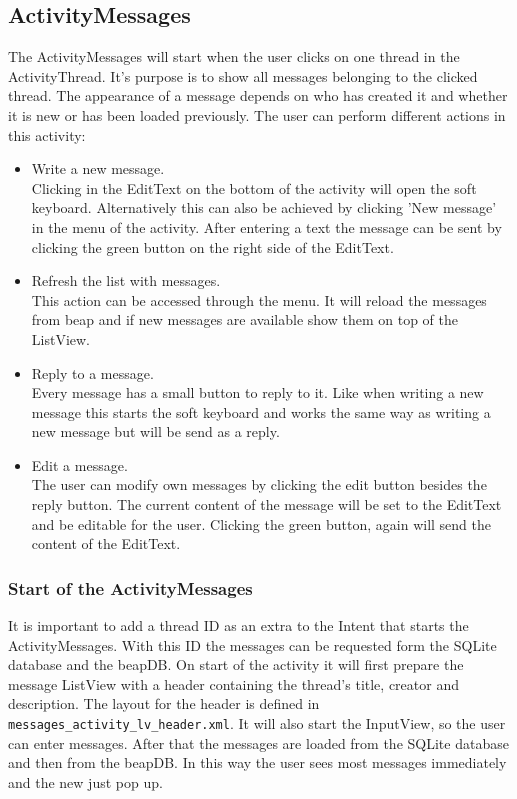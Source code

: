 \documentclass[12pt,a4paper,oneside]{report}
\newcommand{\code}[1]{\lstinline{#1}}
\begin{document}
\subsection{ActivityMessages}
The ActivityMessages will start when the user clicks on one thread in the ActivityThread. It's purpose is to show all messages belonging to the clicked thread. The appearance of a message depends on who has created it and whether it is new or has been loaded previously. The user can perform different actions in this activity:
\begin{itemize}
\item Write a new message.\\
Clicking in the EditText on the bottom of the activity will open the soft keyboard. Alternatively this can also be achieved by clicking 'New message' in the menu of the activity. After entering a text the message can be sent by clicking the green button on the right side of the EditText.

\item Refresh the list with messages.\\
This action can be accessed through the menu. It will reload the messages from beap and if new messages are available show them on top of the ListView.

\item Reply to a message.\\
Every message has a small button to reply to it. Like when writing a new message this starts the soft keyboard and works the same way as writing a new message but will be send as a reply.

\item Edit a message.\\
The user can modify own messages by clicking the edit button besides the reply button. The current content of the message will be set to the EditText and be editable for the user. Clicking the green button, again will send the content of the EditText. 

\end{itemize}

\subsubsection{Start of the ActivityMessages}
It is important to add a thread ID as an extra to the Intent that starts the ActivityMessages. With this ID the messages can be requested form the SQLite database and the beapDB. On start of the activity it will first prepare the message ListView with a header containing the thread's title, creator and description. The layout for the header is defined in \code{messages_activity_lv_header.xml}. It will also start the InputView, so the user can enter messages. After that the messages are loaded from the SQLite database and then from the beapDB. In this way the user sees most messages immediately and the new just pop up. 
\end{document}
